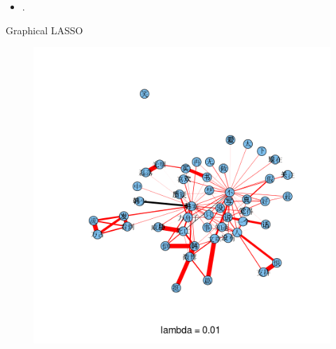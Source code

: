 \documentclass[12pt, trans]{beamer}
\newcommand{\1}[1]{{\mathbf 1}\left\{#1\right\}}        %
\begin{document}
\begin{frame}{}

\begin{itemize}[<+->]
\item .
\end{itemize}

\end{frame}

\begin{frame}{Graphical LASSO}

\begin{figure}
  \centering
  \includegraphics[height=0.9\textheight]{./../../gLassoResults/glasso1.png} 
\end{figure}

\end{frame}
\end{document}
